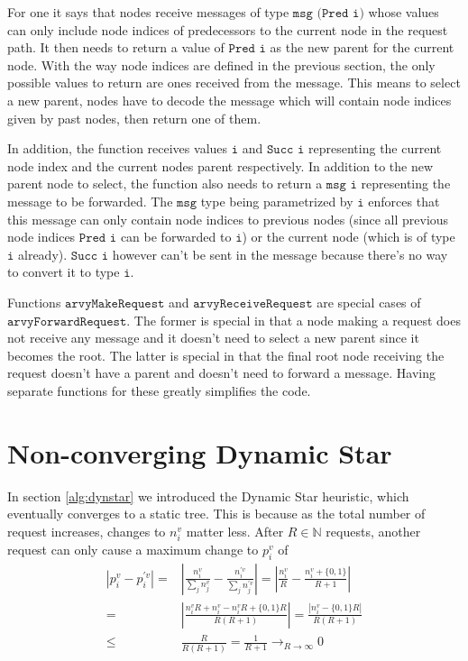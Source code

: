 \documentclass[a4paper, oneside]{discothesis}
\begin{document}
For one it says that nodes receive messages of type $\texttt{msg (Pred i)}$ whose values can only include node indices of predecessors to the current node in the request path. It then needs to return a value of $\texttt{Pred i}$ as the new parent for the current node. With the way node indices are defined in the previous section, the only possible values to return are ones received from the message. This means to select a new parent, nodes have to decode the message which will contain node indices given by past nodes, then return one of them.

In addition, the function receives values $\texttt{i}$ and $\texttt{Succ i}$ representing the current node index and the current nodes parent respectively. In addition to the new parent node to select, the function also needs to return a $\texttt{msg i}$ representing the message to be forwarded. The $\texttt{msg}$ type being parametrized by $\texttt{i}$ enforces that this message can only contain node indices to previous nodes (since all previous node indices $\texttt{Pred i}$ can be forwarded to $\texttt{i}$) or the current node (which is of type $\texttt{i}$ already). $\texttt{Succ i}$ however can't be sent in the message because there's no way to convert it to type $\texttt{i}$.

Functions $\texttt{arvyMakeRequest}$ and $\texttt{arvyReceiveRequest}$ are special cases of $\texttt{arvyForwardRequest}$. The former is special in that a node making a request does not receive any message and it doesn't need to select a new parent since it becomes the root. The latter is special in that the final root node receiving the request doesn't have a parent and doesn't need to forward a message. Having separate functions for these greatly simplifies the code.

\chapter{Non-converging Dynamic Star}\label{alg:ncdynstar}

In section \autoref{alg:dynstar} we introduced the Dynamic Star heuristic, which eventually converges to a static tree. This is because as the total number of request increases, changes to $n_i^v$ matter less. After $R\in\mathbb{N}$ requests, another request can only cause a maximum change to $p_i^v$ of
\begin{equation}
\begin{split}
\left|p_i^v-p_i^{'v}\right| = & \left|\frac{n_i^v}{\sum_jn_j^v}-\frac{n_i^{'v}}{\sum_jn_j^{'v}}\right| = \left|\frac{n_i^v}{R}-\frac{n_i^v+\{0,1\}}{R+1}\right| \\
= & \left|\frac{n_i^vR+n_i^v-n_i^vR+\{0,1\}R}{R(R+1)}\right| = \frac{\left|n_i^v-\{0,1\}R\right|}{R(R+1)} \\
\leq & \frac{R}{R(R+1)}=\frac{1}{R+1}\to_{R\to\infty} 0
\end{split}
\end{equation}
\end{document}
